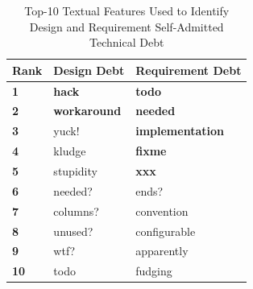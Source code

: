 \begin{table}[!thb]
    \begin{center}
        \caption{Top-10 Textual Features Used to Identify Design and Requirement Self-Admitted Technical Debt}
        \label{tbl:top_ten_features}
        \vspace{-3mm}
        \begin{tabular}{l| l l }
        \toprule
        \textbf{Rank} & \textbf{Design Debt} & \textbf{Requirement Debt}  \\
        \midrule
         \textbf{1}  & \textbf{hack}       &   \textbf{todo}     \\
         \textbf{2}  & \textbf{workaround} &   \textbf{needed}   \\
         \textbf{3}  & yuck!      &   \textbf{implementation}    \\
         \textbf{4}  & kludge     &   \textbf{fixme}             \\
         \textbf{5}  & stupidity  &   \textbf{xxx}               \\
         \textbf{6}  & needed?    &   ends?             \\
         \textbf{7}  & columns?   &   convention        \\
         \textbf{8}  & unused?    &   configurable      \\
         \textbf{9}  & wtf?       &   apparently        \\
         \textbf{10} & todo       &   fudging           \\
        \bottomrule
        \end{tabular}
    \end{center}    
\end{table}

